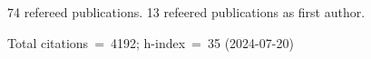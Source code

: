 74 refereed publications. 13 refeered publications as first author.

Total citations~=~4192; h-index~=~35 (2024-07-20)